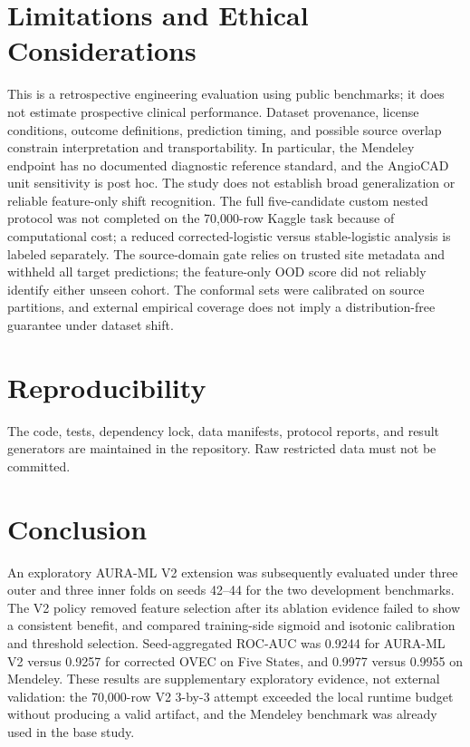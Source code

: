 \documentclass[journal]{IEEEtran}
\begin{document}
\section{Limitations and Ethical Considerations}
This is a retrospective engineering evaluation using public benchmarks; it
does not estimate prospective clinical performance. Dataset provenance,
license conditions, outcome definitions, prediction timing, and possible source
overlap constrain interpretation and transportability. In particular, the
Mendeley endpoint has no documented diagnostic reference standard, and the
AngioCAD unit sensitivity is post hoc. The study does not establish broad
generalization or reliable feature-only shift recognition. The full
five-candidate custom nested protocol was not
completed on the 70,000-row Kaggle task because of computational cost; a
reduced corrected-logistic versus stable-logistic analysis is labeled
separately. The source-domain gate relies on trusted site metadata and
withheld all target predictions; the feature-only OOD score did not reliably
identify either unseen cohort. The conformal sets were calibrated on source
partitions, and external empirical coverage does not imply a distribution-free
guarantee under dataset shift.

\section{Reproducibility}
The code, tests, dependency lock, data manifests, protocol reports, and result
generators are maintained in the repository. Raw restricted data must not be
committed.

\section{Conclusion}
An exploratory AURA-ML V2 extension was subsequently evaluated under three
outer and three inner folds on seeds 42--44 for the two development benchmarks.
The V2 policy removed feature selection after its ablation evidence failed to
show a consistent benefit, and compared training-side sigmoid and isotonic
calibration and threshold selection. Seed-aggregated ROC-AUC was 0.9244 for
AURA-ML V2 versus 0.9257 for corrected OVEC on Five States, and 0.9977 versus
0.9955 on Mendeley. These results are supplementary exploratory evidence, not
external validation: the 70,000-row V2 3-by-3 attempt exceeded the local
runtime budget without producing a valid artifact, and the Mendeley benchmark
was already used in the base study.
\end{document}
